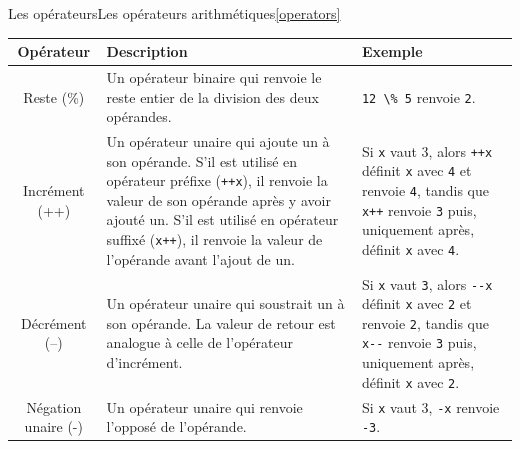 \documentclass{beamer}
\begin{document}
    \begin{frame}{Les opérateurs}{Les opérateurs arithmétiques\cref{operators}}
        \begin{tiny}
            \begin{table}[h!]
                \centering
                \begin{tabular}{|c|p{4cm}|p{4cm}|}
                    \hline
                    \textbf{Opérateur}              & \textbf{Description}                                                                                                                                                                                                                                                                      & \textbf{Exemple}                                                                                                                                                                                                                                 \\
                    \hline
                    Reste (\%)                      & Un opérateur binaire qui renvoie le reste entier de la division des deux opérandes. & \lstinline{12 \% 5} renvoie \lstinline{2}. \\
                    \hline
                    Incrément (++)                  & Un opérateur unaire qui ajoute un à son opérande. S'il est utilisé en opérateur préfixe (\lstinline{++x}), il renvoie la valeur de son opérande après y avoir ajouté un. S'il est utilisé en opérateur suffixé (\lstinline{x++}), il renvoie la valeur de l'opérande avant l'ajout de un. & Si \lstinline{x} vaut 3, alors \lstinline{++x} définit \lstinline{x} avec \lstinline{4} et renvoie \lstinline{4}, tandis que \lstinline{x++} renvoie \lstinline{3} puis, uniquement après, définit \lstinline{x} avec \lstinline{4}. \\
                    \hline
                    Décrément (--)                  & Un opérateur unaire qui soustrait un à son opérande. La valeur de retour est analogue à celle de l'opérateur d'incrément. & Si \lstinline{x} vaut \lstinline{3}, alors \lstinline{--x} définit \lstinline{x} avec \lstinline{2} et renvoie \lstinline{2}, tandis que \lstinline{x--} renvoie \lstinline{3} puis, uniquement après, définit \lstinline{x} avec \lstinline{2}. \\
                    \hline
                    Négation unaire (-)             & Un opérateur unaire qui renvoie l'opposé de l'opérande.                                                                                                                                                                                                                                   & Si \lstinline{x} vaut 3, \lstinline{-x} renvoie \lstinline{-3}.                                                                                                                                                                                  \\

\end{tabular}
\end{table}
\end{tiny}
\end{frame}
\end{document}
